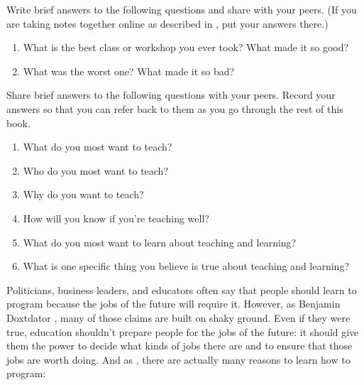 Write brief answers to the following questions and share with your peers.
(If you are taking notes together online as described in ,
put your answers there.)

\begin{enumerate}

\item
  What is the best class or workshop you ever took?
  What made it so good?

\item
  What was the worst one?
  What made it so bad?

\end{enumerate}


Share brief answers to the following questions with your peers.
Record your answers so that you can refer back to them
as you go through the rest of this book.

\begin{enumerate}

\item
  What do you most want to teach?

\item
  Who do you most want to teach?

\item
  Why do you want to teach?

\item
  How will you know if you're teaching well?

\item
  What do you most want to learn about teaching and learning?

\item
  What is one specific thing you believe is true about teaching and learning?

\end{enumerate}


Politicians, business leaders, and educators often say that
people should learn to program because the jobs of the future will require it.
However,
as Benjamin Doxtdator ,
many of those claims are built on shaky ground.
Even if they were true, education shouldn't prepare people for the jobs of the future:
it should give them the power to decide what kinds of jobs there are
and to ensure that those jobs are worth doing.
And as ,
there are actually many reasons to learn how to program:

